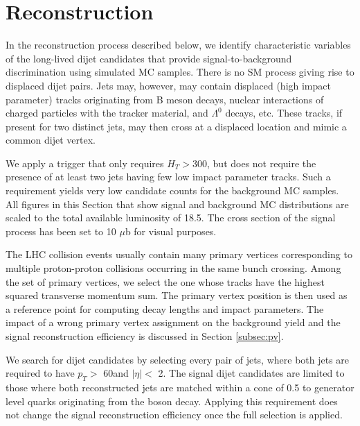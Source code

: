 
\section{Reconstruction}

In the reconstruction process described below, we identify characteristic variables
of the long-lived dijet candidates that provide
signal-to-background discrimination using simulated MC samples.    
There is no SM process giving rise to displaced dijet pairs. Jets may,
however, may contain displaced (high impact parameter) tracks originating from B meson decays, nuclear
interactions of charged particles with the tracker material, \Kshort and $\Lambda^0$ decays, etc. These tracks, if 
present for two distinct jets,
may then cross at a displaced location and mimic a common dijet vertex. 

We apply a trigger that only requires $H_T>$300\GeV, but does not require
the presence of at least two jets having few low impact parameter tracks. Such a requirement
yields very low
candidate counts for the background MC samples.
All figures in this Section that show signal and background MC distributions 
are scaled to the total available luminosity
of 18.5\fbinv. 
The cross section of the signal process has been set to 10 $\mu$b for visual purposes.   

The LHC collision events usually contain many primary vertices corresponding to multiple proton-proton collisions occurring 
in the same bunch crossing.
Among the set of primary vertices, we select the one whose tracks have the highest squared transverse momentum sum.
 The primary vertex position is
then used as a reference point for computing decay lengths and impact parameters. The impact of a wrong
primary vertex assignment on the background yield and the signal reconstruction efficiency is discussed
in Section \ref{subsec:pv}. 


We search for dijet candidates by selecting every pair of jets, where both jets are required
to have $p_T>$ 60\GeV and $|\eta|<$ 2. 
The signal dijet candidates are limited
to those where both reconstructed jets are matched within a cone of 0.5 to generator level quarks originating
 from the \X boson decay. Applying this requirement does not change the signal reconstruction efficiency
once the full selection is applied. 

